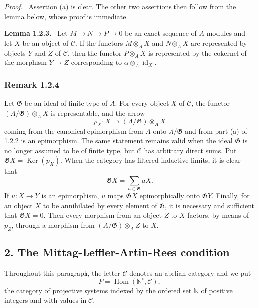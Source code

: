 \documentclass[11pt]{article}
\providecommand{\NN}{\mathbb{N}}
\newenvironment{statement}[1]{\par\medskip\noindent\textbf{#1.}\ }{\par\medskip}
\newenvironment{prooftext}[1][Proof]{\par\noindent\emph{#1.}\ }{\par\medskip}
\DeclareMathOperator{\Hom}{Hom}
\providecommand{\Ker}{\operatorname{Ker}}
\providecommand{\id}{\operatorname{id}}
\providecommand{\Hom}{\operatorname{Hom}}
\providecommand{\NN}{\mathbb N}
\providecommand{\cC}{\mathcal C}
\providecommand{\cG}{\mathfrak G}
\providecommand{\id}{\operatorname{id}}
\providecommand{\Ker}{\operatorname{Ker}}
\providecommand{\Ker}{\operatorname{Ker}}
\providecommand{\id}{\operatorname{id}}
\providecommand{\id}{\operatorname{id}}
\providecommand{\id}{\operatorname{id}}
\providecommand{\cC}{\mathcal C}
\providecommand{\Hom}{\operatorname{Hom}}
\providecommand{\id}{\operatorname{id}}
\begin{document}
\begin{prooftext}[Proof]
Assertion (a) is clear. The other two assertions then follow from the lemma below, whose proof is immediate.
\end{prooftext}

\label{sga5:V:lemma:1.2.3}\begin{statement}{Lemma 1.2.3}
Let $M\to N\to P\to0$ be an exact sequence of $A$-modules and let $X$ be an object of $\cC$. If the functors $M\otimes_A X$ and $N\otimes_A X$ are represented by objects $Y$ and $Z$ of $\cC$, then the functor $P\otimes_A X$ is represented by the cokernel of the morphism $Y\to Z$ corresponding to $\alpha\otimes_A\id_X$.
\end{statement}

\subsubsection*{Remark 1.2.4}\label{sga5:V:remark:1.2.4}
Let $\cG$ be an ideal of finite type of $A$. For every object $X$ of $\cC$, the functor $(A/\cG)\otimes_A X$ is representable, and the arrow
\[
p_X:X\longrightarrow (A/\cG)\otimes_A X
\]
coming from the canonical epimorphism from $A$ onto $A/\cG$ and from part (a) of \hyperref[sga5:V:proposition:1.2.2]{1.2.2} is an epimorphism. The same statement remains valid when the ideal $\cG$ is no longer assumed to be of finite type, but $\cC$ has arbitrary direct sums. Put $\cG X=\Ker(p_X)$. When the category has filtered inductive limits, it is clear that
\[
\cG X=\sum_{a\in\cG}aX.
\]
If $u:X\to Y$ is an epimorphism, $u$ maps $\cG X$ epimorphically onto $\cG Y$. Finally, for an object $X$ to be annihilated by every element of $\cG$, it is necessary and sufficient that $\cG X=0$. Then every morphism from an object $Z$ to $X$ factors, by means of $p_Z$, through a morphism from $(A/\cG)\otimes_A Z$ to $X$.

\subsection*{2. The Mittag-Leffler-Artin-Rees condition}\label{sga5:V:subsection:2}
Throughout this paragraph, the letter $\cC$ denotes an abelian category and we put
\[
P=\Hom(\NN^\circ,\cC),
\]
the category of projective systems indexed by the ordered set $\NN$ of positive integers and with values in $\cC$.
\end{document}
